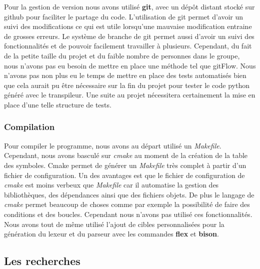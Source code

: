 \documentclass[a4paper]{article}%
\begin{document}
Pour la gestion de version nous avons utilisé \textbf{git}, avec un dépôt
distant stocké sur github pour faciliter le partage du code. L'utilisation de
git permet d'avoir un suivi des modifications ce qui est utile lorsqu'une
mauvaise modification entraine de grosses erreurs. Le système de branche de git
permet aussi d'avoir un suivi des fonctionnalités et de pouvoir facilement
travailler à plusieurs. Cependant, du fait de la petite taille du projet et du
faible nombre de personnes dans le groupe, nous n'avons pas eu besoin de mettre
en place une méthode tel que gitFlow. Nous n'avons pas non plus eu le temps de
mettre en place des tests automatisés bien que cela aurait pu être nécessaire
sur la fin du projet pour tester le code python généré avec le transpileur. Une
suite au projet nécessitera certainement la mise en place d'une telle structure
de tests.\\

\subsubsection{Compilation}

Pour compiler le programme, nous avons au départ utilisé un \textit{Makefile}.
Cependant, nous avons basculé sur \textit{cmake} au moment de la création de la
table des symboles. Cmake permet de générer un \textit{Makefile} très complet à
partir d'un fichier de configuration. Un des avantages est que le fichier de
configuration de \textit{cmake} est moins verbeux que \textit{Makefile} car il
automatise la gestion des bibliothèques, des dépendances ainsi que des fichiers
objets. De plus le langage de \textit{cmake} permet beaucoup de choses comme par
exemple la possibilité de faire des conditions et des boucles. Cependant nous
n'avons pas utilisé ces fonctionnalités. Nous avons tout de même utilisé l'ajout
de cibles personnalisées pour la génération du lexeur et du parseur avec les
commandes \textbf{flex} et \textbf{bison}.

\subsection{Les recherches}
\end{document}
